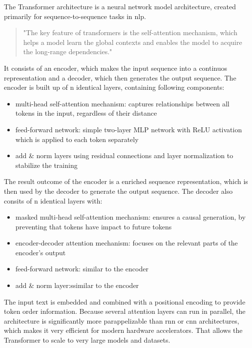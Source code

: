 \documentclass[conference]{IEEEtran}
\begin{document}
  The Transformer architecture is a neural network model architecture, created primarily for sequence-to-sequence tasks in \ac{nlp}. 
  \begin{quote}
    "The key feature of transformers is the self-attention mechanism, which helps a model learn the global contexts and enables the model to acquire the long-range dependencies." \cite{vit-state-challenges}
  \end{quote}
  It consists of an encoder, which makes the input sequence into a continuos representation and a decoder, which then generates the output sequence. The encoder is built up of n identical layers, containing following components:
  \begin{itemize}
    \item multi-head self-attention mechanism: captures relationships between all tokens in the input, regardless of their distance
    \item feed-forward network: simple two-layer MLP network with ReLU activation which is applied to each token separately
    \item add \& norm layers using residual connections and layer normalization to stabilize the training
  \end{itemize}
  The result outcome of the encoder is a enriched sequence representation, which is then used by the decoder to generate the output sequence. The decoder also consits of n identical layers with:
  \begin{itemize}
    \item masked multi-head self-attention mechanism: ensures a causal generation, by preventing that tokens have impact to future tokens
    \item encoder-decoder attention mechanism: focuses on the relevant parts of the encoder's output
    \item feed-forward network: similar to the encoder
    \item add \& norm layer:ssimilar to the encoder
  \end{itemize}
  The input text is embedded and combined with a positional encoding to provide token order information. Because several attention layers can run in parallel, the architecture is significantly more parappelizable than \ac{rnn} or \ac{cnn} architectures, which makes it very efficient for modern hardware accelerators. That allows the Transformer to scale to very large models and datasets. \cite{transformer2017}
\end{document}
